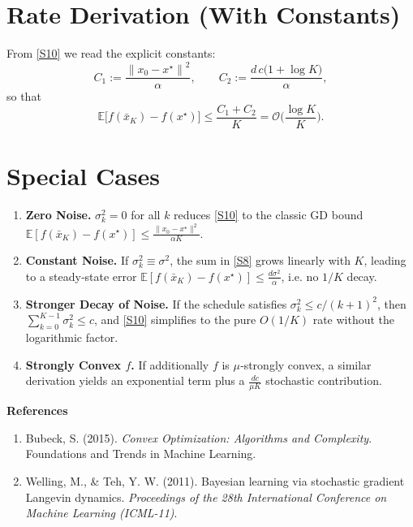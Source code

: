 \documentclass[11pt]{article}
\newcommand{\EE}{\mathbb{E}}
\newcommand{\norm}[1]{\left\lVert #1\right\rVert}
\begin{document}
\section*{Rate Derivation (With Constants)}
From \eqref{S10} we read the explicit constants:
\[
C_{1}:=\frac{\norm{x_{0}-x^{\star}}^{2}}{\alpha},\qquad
C_{2}:=\frac{d\,c\big(1+\log K\big)}{\alpha},
\]
so that
\[
\EE\!\big[f(\bar{x}_{K})-f(x^{\star})\big]\le \frac{C_{1}+C_{2}}{K}
= \mathcal O\!\Big(\frac{\log K}{K}\Big).
\]

\section*{Special Cases}
\begin{enumerate}
\item \textbf{Zero Noise.} $\sigma_{k}^{2}=0$ for all $k$ reduces \eqref{S10} to the classic GD bound $\EE[f(\bar{x}_{K})-f(x^{\star})]\le \frac{\|x_{0}-x^{\star}\|^{2}}{\alpha K}$.
\item \textbf{Constant Noise.} If $\sigma_{k}^{2}\equiv \sigma^{2}$, the sum in \eqref{S8} grows linearly with $K$, leading to a steady‑state error $\EE[f(\bar{x}_{K})-f(x^{\star})]\le \frac{d\sigma^{2}}{\alpha}$, i.e. no $1/K$ decay.
\item \textbf{Stronger Decay of Noise.} If the schedule satisfies $\sigma_{k}^{2}\le c/(k+1)^{2}$, then $\sum_{k=0}^{K-1}\sigma_{k}^{2}\le c$, and \eqref{S10} simplifies to the pure $O(1/K)$ rate without the logarithmic factor.
\item \textbf{Strongly Convex $f$.} If additionally $f$ is $\mu$‑strongly convex, a similar derivation yields an exponential term plus a $\frac{d c}{\mu K}$ stochastic contribution.
\end{enumerate}

\bigskip
\noindent\textbf{References}
\begin{enumerate}
\item Bubeck, S. (2015). \emph{Convex Optimization: Algorithms and Complexity}. Foundations and Trends in Machine Learning.
\item Welling, M., \& Teh, Y. W. (2011). Bayesian learning via stochastic gradient Langevin dynamics. \emph{Proceedings of the 28th International Conference on Machine Learning (ICML-11)}.
\end{enumerate}
\end{document}
